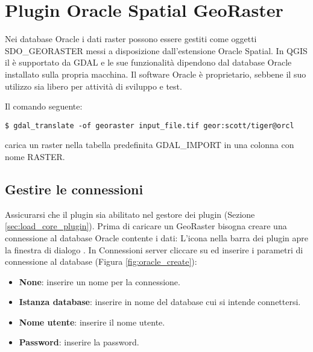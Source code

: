 
\section{Plugin Oracle Spatial GeoRaster}\label{sec:oracleraster}


Nei database Oracle i dati raster possono essere gestiti come oggetti SDO\_GEORASTER messi 
a disposizione dall'estensione Oracle Spatial. In QGIS il  
è supportato da GDAL e le sue funzionalità dipendono dal database Oracle installato sulla 
propria macchina. 
Il software Oracle è proprietario, sebbene il suo utilizzo sia libero per attività di 
sviluppo e test.

Il comando seguente: 

\begin{verbatim} 
$ gdal_translate -of georaster input_file.tif geor:scott/tiger@orcl
\end{verbatim}

carica un raster nella tabella predefinita GDAL\_IMPORT in una colonna con nome RASTER.

\subsection{Gestire le connessioni}

Assicurarsi che il plugin sia abilitato nel gestore dei plugin (Sezione \ref{sec:load_core_plugin}). 
Prima di caricare un GeoRaster bisogna creare una connessione al database Oracle contente i dati:
L'icona  nella barra dei plugin apre la finestra 
di dialogo . In Connessioni server cliccare su  ed 
inserire i parametri di connessione al database (Figura \ref{fig:oracle_create}):

\begin{itemize}[label=--]
\item \textbf{None}: inserire un nome per la connessione.
\item \textbf{Istanza database}: inserire in nome del database cui si intende connettersi.
\item \textbf{Nome utente}: inserire il nome utente.
\item \textbf{Password}: inserire la password.
\end{itemize}

